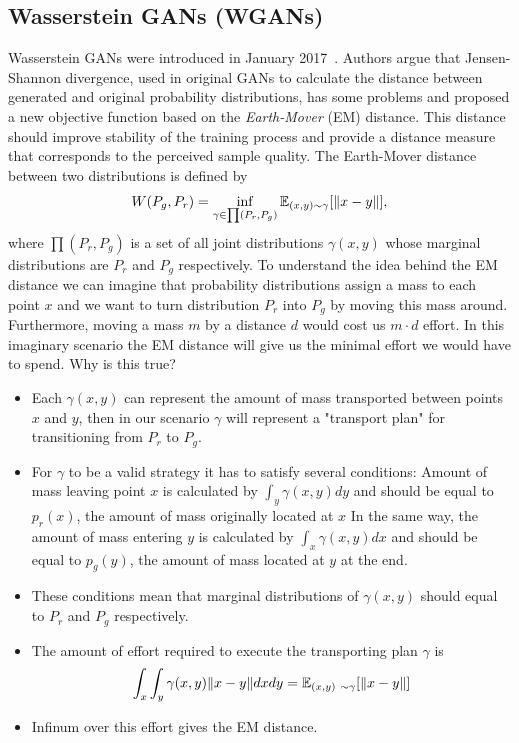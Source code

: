 \subsection{Wasserstein GANs (WGANs)}
Wasserstein GANs were introduced in January 2017~\citep{wgan}. Authors argue that Jensen-Shannon divergence, used in original GANs to calculate the distance between generated and original probability distributions, has some problems and proposed a new objective function based on the \textit{Earth-Mover} (EM)  distance. This distance should improve stability of the training process and provide a distance measure that corresponds to the perceived sample quality. 
	The Earth-Mover distance between two distributions is defined by
\begin{equation}
	W(P_g, P_r) =  \inf_{\gamma \in \prod (P_r, P_g)}  \operatorname{\mathbb{E}}_{(x,y) \sim \gamma} [ \lVert x - y \lVert ],
\end{equation}
where $\prod (P_r, P_g)$ is a set of all joint distributions $\gamma(x,y)$ whose marginal distributions are $P_r$ and $P_g$ respectively. To understand the idea behind the EM distance we can imagine that probability distributions assign a mass to each point $x$ and we want to turn distribution $P_r$ into $P_g$ by moving this mass around. Furthermore, moving a mass $m$ by a distance $d$ would cost us $m \cdot d$ effort. In this imaginary scenario the EM distance will give us the minimal effort we would have to spend. Why is this true? 
\begin{itemize}
	\item Each $\gamma(x, y)$ can represent the amount of mass transported between points $x$ and $y$, then in our scenario $\gamma$ will represent a "transport plan" for transitioning from $P_r$ to $P_g$.
	\item For $\gamma$ to be a valid strategy it has to satisfy several conditions:
		\subitem Amount of mass leaving point $x$ is calculated by $\int_y \gamma(x, y) dy$ and should be equal to $p_r(x)$, the amount of mass originally located at $x$
		\subitem In the same way, the amount of mass entering $y$ is calculated by $\int_x \gamma(x, y) dx$ and should be equal to $p_g(y)$, the amount of mass located at $y$ at the end.
	\item These conditions mean that marginal distributions of $\gamma(x, y)$ should equal to $P_r$ and $P_g$ respectively. 
	\item The amount of effort required to execute the transporting plan $\gamma$ is 
	\begin{equation}
	\int_x \int_y \gamma(x,y) \lVert x - y \lVert dx dy = \operatorname{\mathbb{E}}_{(x,y) ~\sim \gamma} [ \lVert x - y \lVert ]
	\end{equation}
	\item Infinum over this effort gives the EM distance. 
\end{itemize}

